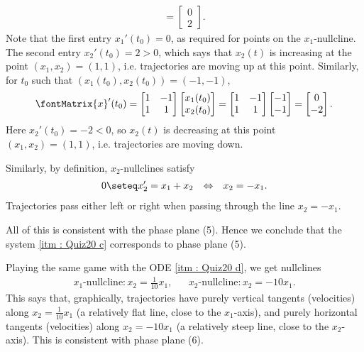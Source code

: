 {\begin{align*}
=
\begin{bmatrix}
0	\\
2
\end{bmatrix}%
.
\end{align*}
Note that the first entry $x_{1}'(t_{0}) = 0$, as required for points on the $x_{1}$-nullcline. The second entry $x_{2}'(t_{0}) = 2 > 0$, which says that $x_{2}(t)$ is increasing at the point $(x_{1},x_{2}) = (1,1)$, i.e. trajectories are moving up at this point. Similarly, for $t_{0}$ such that $(x_{1}(t_{0}),x_{2}(t_{0})) = (-1,-1)$,
\begin{align*}
\fontMatrix{x}'(t_{0})
=
\begin{bmatrix}
1	&	-1	\\
1	&	1
\end{bmatrix}
\begin{bmatrix}
x_{1}(t_{0})	\\
x_{2}(t_{0})
\end{bmatrix}
=
\begin{bmatrix}
1	&	-1	\\
1	&	1
\end{bmatrix}
\begin{bmatrix}
-1	\\
-1
\end{bmatrix}
=
\begin{bmatrix}
0	\\
-2
\end{bmatrix}%
.
\end{align*}
Here $x_{2}'(t_{0}) = -2 < 0$, so $x_{2}(t)$ is decreasing at this point $(x_{1},x_{2}) = (1,1)$, i.e. trajectories are moving down.

Similarly, by definition, $x_{2}$-nullclines satisfy
\begin{align*}
0
\seteq
x_{2}'
=
x_{1} + x_{2}
&&
\Leftrightarrow
&&
x_{2}
=
-x_{1}.
\end{align*}
Trajectories pass either left or right when passing through the line $x_{2} = -x_{1}$.

All of this is consistent with the phase plane (5). Hence we conclude that the system \ref{itm : Quiz20 c} corresponds to phase plane (5).

Playing the same game with the ODE \ref{itm : Quiz20 d}, we get nullclines
\begin{align*}
\text{$x_{1}$-nullcline}
:
x_{2}
=
\frac{1}{10} x_{1},
&&
\text{$x_{2}$-nullcline}
:
x_{2}
=
-10 x_{1}.
\end{align*}
This says that, graphically, trajectories have purely vertical tangents (velocities) along $x_{2} = \frac{1}{10} x_{1}$ (a relatively flat line, close to the $x_{1}$-axis), and purely horizontal tangents (velocities) along $x_{2} = -10 x_{1}$ (a relatively steep line, close to the $x_{2}$-axis). This is consistent with phase plane (6).

}
